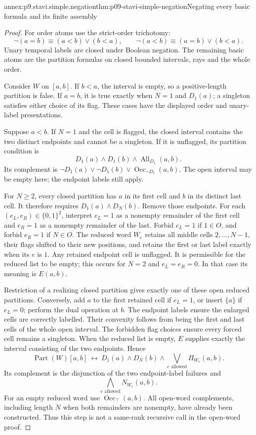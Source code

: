 \begin{annexitem}{annex:p9.stavi.simple.negation}{thm:p09-stavi-simple-negation}{Negating every basic formula and its finite assembly}
\begin{proof}
For order atoms use the strict-order
trichotomy:
\[
 \neg(a=b)\equiv(a<b)\lor(b<a),\qquad
 \neg(a<b)\equiv(a=b)\lor(b<a).
\]
Unary temporal labels are closed
under Boolean negation. The
remaining basic atoms are
the partition formulas on
closed bounded intervals,
rays and the whole order.

Consider \(W\) on \([a,b]\).
If \(b<a\), the interval
is empty, so a positive-length
partition is false. If \(a=b\),
it is true exactly when
\(N=1\) and \(D_1(a)\);
a singleton satisfies either
choice of its flag.
These cases have the displayed
order and unary-label
presentations.

Suppose \(a<b\). If \(N=1\)
and the cell is flagged,
the closed interval contains
the two distinct endpoints
and cannot be a singleton.
If it is unflagged, its
partition condition is
\[
 D_1(a)\land D_1(b)\land
                           \operatorname{All}_{D_1}(a,b).
\]
Its complement is
\(\neg D_1(a)\lor\neg D_1(b)
       \lor\operatorname{Occ}_{\neg D_1}(a,b)\).
The open interval may be
empty here; the endpoint
labels still apply.

For \(N\geq2\), every closed
partition has \(a\) in its
first cell and \(b\) in
its distinct last cell.
It therefore requires
\(D_1(a)\land D_N(b)\).
Remove those endpoints.
For each
\((e_L,e_R)\in\{0,1\}^2\),
interpret \(e_L=1\) as
a nonempty remainder of
the first cell and
\(e_R=1\) as a nonempty
remainder of the last.
Forbid \(e_L=1\) if
\(1\in O\), and forbid
\(e_R=1\) if \(N\in O\).
The reduced word \(W_e\)
retains all middle cells
\(2,\ldots,N-1\), their
flags shifted to their
new positions, and retains
the first or last label
exactly when its \(e\)
is \(1\). Any retained
endpoint cell is unflagged.
It is permissible for the
reduced list to be empty;
this occurs for \(N=2\)
and \(e_L=e_R=0\).
In that case its meaning
is \(E(a,b)\).

Restriction of a realizing
closed partition gives
exactly one of these
open reduced partitions.
Conversely, add \(a\)
to the first retained
cell if \(e_L=1\), or
insert \(\{a\}\) if
\(e_L=0\); perform the
dual operation at \(b\).
The endpoint labels
ensure the enlarged cells
are correctly labelled.
Their convexity follows
from being the first
and last cells of the
whole open interval.
The forbidden flag choices
ensure every forced cell
remains a singleton.
When the reduced list
is empty, \(E\) supplies
exactly the interval
consisting of the two
endpoints. Hence
\[
 \operatorname{Part}(W)[a,b]\ \longleftrightarrow\
 D_1(a)\land D_N(b)\land
                  \bigvee_{e\text{ allowed}}\Pi_{W_e}(a,b).
\]
Its complement is the
disjunction of the two
endpoint-label failures
and
\[
                 \bigwedge_{e\text{ allowed}}N_{W_e}(a,b).
\]
For an empty reduced
word use
\(\operatorname{Occ}_{\top}(a,b)\).
All open-word complements,
including length \(N\)
when both remainders are
nonempty, have already
been constructed. Thus
this step is not a
same-rank recursive call
in the open-word proof.


\end{proof}
\end{annexitem}
